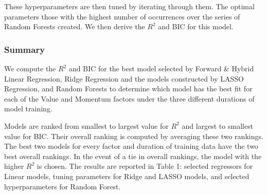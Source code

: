 \documentclass[AER]{AEA}
\begin{document}
\begin{spacing}{2}
These hyperparameters are then tuned by iterating through them. The optimal parameters those with the highest number of occurrences over the series of Random Forests created. We then derive the \(R^2\) and BIC for this model.

\subsubsection{Summary}

We compute the \(R^2\) and BIC for the best model selected by Forward \& Hybrid Linear Regression, Ridge Regression and the models constructed by LASSO Regression, and Random Forests to determine which model has the best fit for each of the Value and Momentum factors under the three different durations of model training.

Models are ranked from smallest to largest value for \(R^2\) and largest to smallest value for BIC. Their overall ranking is computed by averaging these two rankings. The best two models for every factor and duration of training data have the two best overall rankings. In the event of a tie in overall rankings, the model with the higher \(R^2\) is chosen. The results are reported in Table 1: selected regressors for Linear models, tuning parameters for Ridge and LASSO models, and selected hyperparameters for Random Forest.


\end{spacing}
\end{document}
